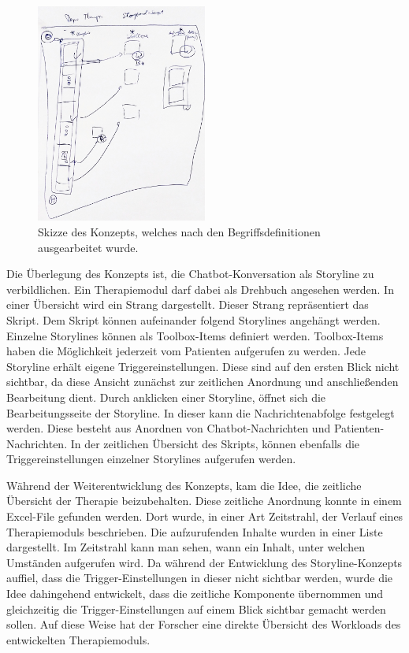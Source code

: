\begin{figure}[h]
\centering
\includegraphics[width=0.5\textwidth]{pictures/storylinekonz}
\caption{Skizze des Konzepts, welches nach den Begriffsdefinitionen ausgearbeitet wurde. }
\label{storylinekonz}
\end{figure}

Die Überlegung des Konzepts ist, die Chatbot-Konversation als Storyline zu verbildlichen. Ein Therapiemodul darf dabei als Drehbuch angesehen werden. In einer Übersicht wird ein Strang dargestellt. Dieser Strang repräsentiert das Skript. Dem Skript können aufeinander folgend Storylines angehängt werden. Einzelne Storylines können als Toolbox-Items definiert werden. Toolbox-Items haben die Möglichkeit jederzeit vom Patienten aufgerufen zu werden. Jede Storyline erhält eigene Triggereinstellungen. Diese sind auf den ersten Blick nicht sichtbar, da diese Ansicht zunächst zur zeitlichen Anordnung und anschließenden Bearbeitung dient. Durch anklicken einer Storyline, öffnet sich die Bearbeitungsseite der Storyline. In dieser kann die Nachrichtenabfolge festgelegt werden. Diese besteht aus Anordnen von Chatbot-Nachrichten und Patienten-Nachrichten. In der zeitlichen Übersicht des Skripts, können ebenfalls die Triggereinstellungen einzelner Storylines aufgerufen werden. 

Während der Weiterentwicklung des Konzepts, kam die Idee, die zeitliche Übersicht der Therapie beizubehalten. Diese zeitliche Anordnung konnte in einem Excel-File gefunden werden. Dort wurde, in einer Art Zeitstrahl, der Verlauf eines Therapiemoduls beschrieben. Die aufzurufenden Inhalte wurden in einer Liste dargestellt. Im Zeitstrahl kann man sehen, wann ein Inhalt, unter welchen Umständen aufgerufen wird. Da während der Entwicklung des Storyline-Konzepts auffiel, dass die Trigger-Einstellungen in dieser nicht sichtbar werden, wurde die Idee dahingehend entwickelt, dass die zeitliche Komponente übernommen und gleichzeitig die Trigger-Einstellungen auf einem Blick sichtbar gemacht werden sollen. Auf diese Weise hat der Forscher eine direkte Übersicht des Workloads des entwickelten Therapiemoduls. 


